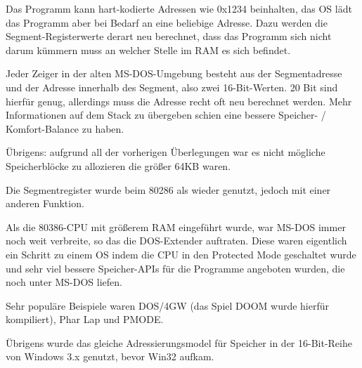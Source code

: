 Das Programm kann hart-kodierte Adressen wie 0x1234 beinhalten, das \ac{OS} lädt
das Programm aber bei Bedarf an eine beliebige Adresse. Dazu werden die Segment-Registerwerte
derart neu berechnet, dass das Programm sich nicht darum kümmern muss an welcher
Stelle im RAM es sich befindet.

Jeder Zeiger in der alten MS-DOS-Umgebung besteht aus der Segmentadresse und der
Adresse innerhalb des Segment, also zwei 16-Bit-Werten. 20 Bit sind hierfür genug,
allerdings muss die Adresse recht oft neu berechnet werden. Mehr Informationen auf
dem Stack zu übergeben schien eine bessere Speicher- / Komfort-Balance zu haben.

Übrigens: aufgrund all der vorherigen Überlegungen war es nicht mögliche Speicherblöcke
zu allozieren die größer 64KB waren.


Die Segmentregister wurde beim 80286 als  wieder genutzt, jedoch mit
einer anderen Funktion.


Als die 80386-CPU mit größerem \ac{RAM} eingeführt wurde, war MS-DOS immer noch
weit verbreite, so das die DOS-Extender auftraten. Diese waren eigentlich ein
Schritt zu einem  \ac{OS} indem die CPU in den Protected Mode geschaltet
wurde und sehr viel bessere Speicher-\ac{API}s für die Programme angeboten wurden,
die noch unter MS-DOS liefen.

Sehr populäre Beispiele waren DOS/4GW (das Spiel DOOM wurde hierfür kompiliert),
Phar Lap und PMODE.
\par
{}

Übrigens wurde das gleiche Adressierungsmodel für Speicher in der 16-Bit-Reihe von
Windows 3.x genutzt, bevor Win32 aufkam.
